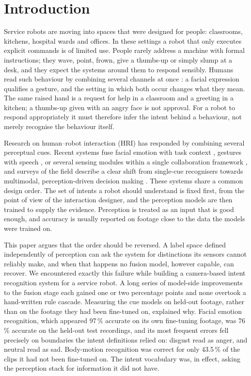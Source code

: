 \section{Introduction}\label{sec:intro}

Service robots are moving into spaces that were designed for people:
classrooms, kitchens, hospital wards and offices. In these settings a robot
that only executes explicit commands is of limited use. People rarely address a
machine with formal instructions; they wave, point, frown, give a thumbs-up or
simply slump at a desk, and they expect the systems around them to respond
sensibly. Humans read such behaviour by combining several channels at once
\citep{argyle1988bodily}: a facial expression qualifies a gesture, and the
setting in which both occur changes what they mean. The same raised hand is a
request for help in a classroom and a greeting in a kitchen; a thumbs-up given
with an angry face is not approval. For a robot to respond appropriately it must
therefore infer the intent behind a behaviour, not merely recognise the
behaviour itself.

Research on human--robot interaction (HRI) has responded by combining several
perceptual cues. Recent systems fuse facial emotion with task context
\citep{mamodiya2025adaptive}, gestures with speech \citep{chen2022real}, or
several sensing modules within a single collaboration framework
\citep{paul2023enhancing}, and surveys of the field describe a clear shift
from single-cue recognisers towards multimodal, perception-driven decision
making \citep{zhao2025multimodal}. These systems share a common design order.
The set of intents a robot should understand is fixed first, from the point of
view of the interaction designer, and the perception models are then trained
to supply the evidence. Perception is treated as an input that is good enough,
and accuracy is usually reported on footage close to the data the models were
trained on.

This paper argues that the order should be reversed. A label space defined
independently of perception can ask the system for distinctions its sensors
cannot reliably make, and when that happens no fusion model, however capable,
can recover. We encountered exactly this failure while building a
camera-based intent recognition system for a service robot. A long series of
model-side improvements to the fusion stage each gained one or two percentage
points and none overtook a hand-written rule cascade. Measuring the cue models
on held-out footage, rather than on the footage they had been fine-tuned on,
explained why. Facial emotion recognition, which appeared 97\,\% accurate on
its own fine-tuning footage, was 76\,\% accurate on the held-out test
recordings, and its most frequent errors fell precisely on boundaries the
intent definitions relied on: disgust read as anger, and neutral read as sad.
Body-motion recognition was correct for only 43.5\,\% of the clips it had not
been fine-tuned on. The intent vocabulary was, in effect, asking the
perception stack for information it did not have.


